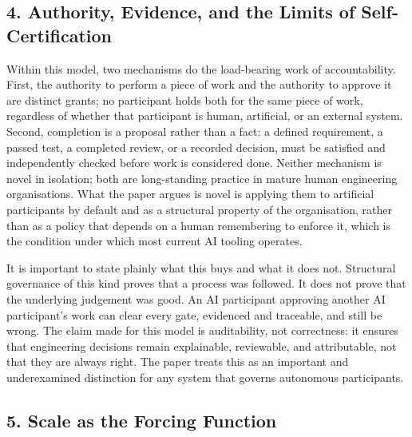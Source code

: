 \documentclass[
  11pt,
]{article}
\begin{document}
\hypertarget{authority-evidence-and-the-limits-of-self-certification}{%
\subsection{4. Authority, Evidence, and the Limits of
Self-Certification}\label{authority-evidence-and-the-limits-of-self-certification}}

Within this model, two mechanisms do the load-bearing work of
accountability. First, the authority to perform a piece of work and the
authority to approve it are distinct grants; no participant holds both
for the same piece of work, regardless of whether that participant is
human, artificial, or an external system. Second, completion is a
proposal rather than a fact: a defined requirement, a passed test, a
completed review, or a recorded decision, must be satisfied and
independently checked before work is considered done. Neither mechanism
is novel in isolation; both are long-standing practice in mature human
engineering organisations. What the paper argues is novel is applying
them to artificial participants by default and as a structural property
of the organisation, rather than as a policy that depends on a human
remembering to enforce it, which is the condition under which most
current AI tooling operates.

It is important to state plainly what this buys and what it does not.
Structural governance of this kind proves that a process was followed.
It does not prove that the underlying judgement was good. An AI
participant approving another AI participant's work can clear every
gate, evidenced and traceable, and still be wrong. The claim made for
this model is auditability, not correctness: it ensures that engineering
decisions remain explainable, reviewable, and attributable, not that
they are always right. The paper treats this as an important and
underexamined distinction for any system that governs autonomous
participants.

\hypertarget{scale-as-the-forcing-function}{%
\subsection{5. Scale as the Forcing
Function}\label{scale-as-the-forcing-function}}
\end{document}
